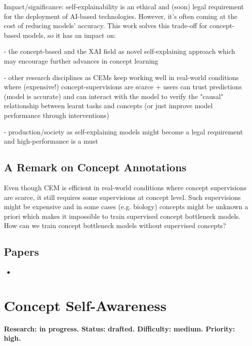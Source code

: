 \documentclass[withindex,glossary]{cam-thesis}
\begin{document}
Impact/significance: self-explainability is an ethical and (soon) legal requirement for the deployment of AI-based technologies. However, it's often coming at the cost of reducing models' accuracy. This work solves this trade-off for concept-based models, so it has an impact on:

- the concept-based and the XAI field as novel self-explaining approach which may encourage further advances in concept learning

- other research disciplines as CEMs keep working well in real-world conditions where (expensive!) concept-supervisions are scarce + users can trust predictions (model is accurate) and can interact with the model to verify the "causal" relationship between learnt tasks and concepts (or just improve model performance through interventions)

- production/society as self-explaining models might become a legal requirement and high-performance is a must

\section{A Remark on Concept Annotations}
Even though CEM is efficient in real-world conditions where concept supervisions are scarce, it still requires some supervisions at concept level. Such supervisions might be expensive and in some cases (e.g. biology) concepts might be unknown a priori which makes it impossible to train supervised concept bottleneck models. How can we train concept bottleneck models without supervised concepts?


\section*{Papers}
\nobibliography*
\begin{itemize}
    \item {}
\end{itemize}


\chapter{Concept Self-Awareness} \label{chapter:unsupervised}
\textbf{Research: in progress. Status: drafted. Difficulty: medium. Priority: high.}
\end{document}
